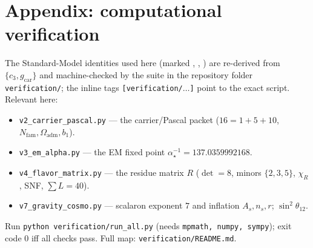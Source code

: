 \documentclass[11pt,a4paper]{article}
\newcommand{\gcar}{g_{\mathrm{car}}}
\newcommand{\Nfam}{N_{\mathrm{fam}}}
\newcommand{\Oadm}{\Omega_{\mathrm{adm}}}
\newcommand{\cthree}{c_3}
\newcommand{\ainv}{\alpha^{-1}_\star}
\theoremstyle{definition}
\begin{document}
\section*{Appendix: computational verification}
The Standard-Model identities used here (marked \mE, \mE, \mE) are re-derived from $\{\cthree,\gcar\}$ and
machine-checked by the suite in the repository folder \texttt{verification/}; the inline tags
\texttt{[verification/$\dots$]} point to the exact script. Relevant here:
\begin{itemize}[leftmargin=1.4em,itemsep=1pt]
\item \texttt{v2\_carrier\_pascal.py} --- the carrier/Pascal packet ($16{=}1{+}5{+}10$, $\Nfam,\Oadm,b_1$).
\item \texttt{v3\_em\_alpha.py} --- the EM fixed point $\ainv{=}137.0359992168$.
\item \texttt{v4\_flavor\_matrix.py} --- the residue matrix $R$ ($\det{=}8$, minors $\{2,3,5\}$, $\chi_R$, SNF, $\sum L{=}40$).
\item \texttt{v7\_gravity\_cosmo.py} --- scalaron exponent $7$ and inflation $A_s,n_s,r$; $\sin^2\theta_{12}$.
\end{itemize}
Run \texttt{python verification/run\_all.py} (needs \texttt{mpmath, numpy, sympy}); exit code $0$ iff all
checks pass. Full map: \texttt{verification/README.md}.


\end{document}
